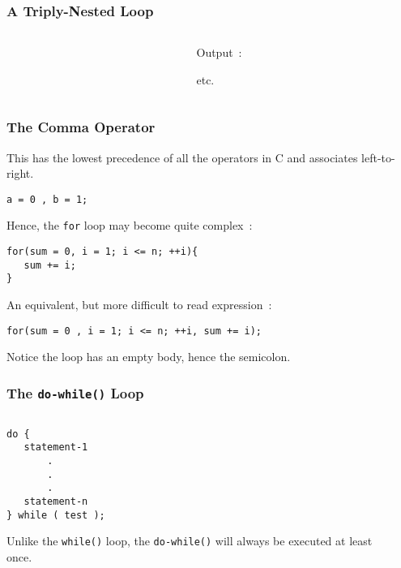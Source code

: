\begin{frame}[fragile]
\frametitle{A Triply-Nested Loop}

\begin{columns}
\begin{column}{0.55\textwidth}

\end{column}

\begin{column}{0.40\textwidth}
{\scriptsize Output~:}

{\scriptsize etc.}

\end{column}

\end{columns}
\end{frame}

\begin{frame}[fragile]
\frametitle{The Comma Operator}

This has the lowest precedence of all the operators in C
and associates left-to-right.

\begin{lstlisting}[style=basicc,numbers=none]
a = 0 , b = 1;
\end{lstlisting}

Hence, the {\tt for} loop may become quite complex~:

\begin{lstlisting}[style=basicc,numbers=none]
for(sum = 0, i = 1; i <= n; ++i){
   sum += i;
}
\end{lstlisting}

An equivalent, but more difficult to read expression~:
\begin{lstlisting}[style=basicc,numbers=none]
for(sum = 0 , i = 1; i <= n; ++i, sum += i);
\end{lstlisting}

Notice the loop has an empty body, hence the semicolon.
\end{frame}

\begin{frame}[fragile]
\frametitle{The {\tt do-while()} Loop}

\begin{columns}
\begin{column}{0.35\textwidth}
\begin{lstlisting}[style=basicc,numbers=none]
do {
   statement-1
       .
       .
       .
   statement-n
} while ( test );
\end{lstlisting}

Unlike the \verb^while()^ loop, the \verb^do-while()^ will always
be executed at least once.
\end{column}

\begin{column}{0.60\textwidth}

\end{column}

\end{columns}
\end{frame}

